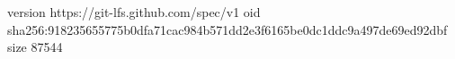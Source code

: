version https://git-lfs.github.com/spec/v1
oid sha256:918235655775b0dfa71cac984b571dd2e3f6165be0dc1ddc9a497de69ed92dbf
size 87544
